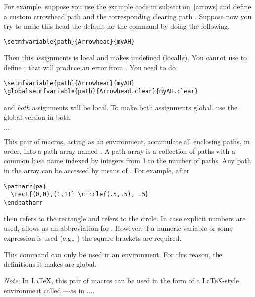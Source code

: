 \documentclass[letterpaper]{article}
\begin{document}
For example, suppose you use the example code in subsection~\ref{arrows}
and define a custom arrowhead path  and the corresponding
clearing path . Suppose now you try to make this head
the default for the  command by doing the following.
\begin{verbatim}
\setmfvariable{path}{Arrowhead}{myAH}
\end{verbatim}
Then this assignments is local and makes  undefined
(locally). You cannot use  to define
; that will produce an error from \MF{}. You need
to do
\begin{verbatim}
\setmfvariable{path}{Arrowhead}{myAH}
\globalsetmfvariable{path}{Arrowhead.clear}{myAH.clear}
\end{verbatim}
and \emph{both} assignments will be local. To make both assignments
global, use the global version in both.


\begin{cd}
$\ldots$%
%
\end{cd}

This pair of macros, acting as an environment, accumulate all enclosing
paths, in order, into a path array named . A path array is a
collection of paths with a common base name indexed by integers from 1
to the number of paths.  Any path in the array can be accessed by means
of . For example, after
\begin{verbatim}
\patharr{pa}
  \rect{(0,0),(1,1)} \circle{(.5,.5), .5}
\endpatharr
\end{verbatim}
then  refers to the rectangle and
 refers to the circle. In case explicit numbers
are used, \MF{} allows  as an abbreviation for .
However, if a numeric variable or some expression is used (e.g.,
) the square brackets are required.

This command can only be used in an  environment. For this
reason, the definitions it makes are global.

\emph{Note}: In \LaTeX{}, this pair of macros can be used in the form of a
\LaTeX{}-style environment called ---as in
$\ldots$.
\end{document}
